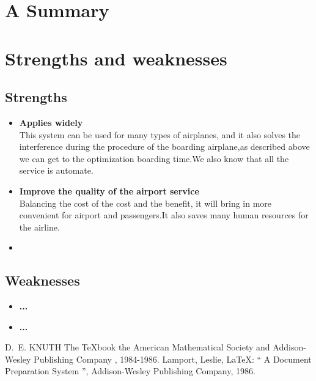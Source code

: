\documentclass{mcmthesis}
\begin{document}
\section{A Summary}

\section{Strengths and weaknesses}

\subsection{Strengths}
\begin{itemize}
\item \textbf{Applies widely}\\
This  system can be used for many types of airplanes, and it also
solves the interference during  the procedure of the boarding
airplane,as described above we can get to the  optimization
boarding time.We also know that all the service is automate.
\item \textbf{Improve the quality of the airport service}\\
Balancing the cost of the cost and the benefit, it will bring in
more convenient  for airport and passengers.It also saves many
human resources for the airline. \item \textbf{}
\end{itemize}
\subsection{Weaknesses}
\begin{itemize}
  \item \textbf{...}
  \item \textbf{...}
\end{itemize}


\begin{thebibliography}{99}
 D.~E. KNUTH   The \TeX{}book  the American
Mathematical Society and Addison-Wesley
Publishing Company , 1984-1986.
Lamport, Leslie,  \LaTeX{}: `` A Document Preparation System '',
Addison-Wesley Publishing Company, 1986.
\end{thebibliography}
\end{document}
